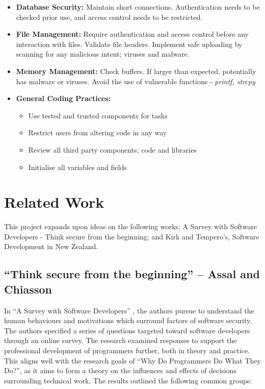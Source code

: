 \begin{itemize}
\item \textbf{Database Security:} Maintain short connections. Authentication needs to be checked prior use, and access control needs to be restricted. 
\item \textbf{File Management:} Require authentication and access control before any interaction with files. Validate file headers. Implement safe uploading by scanning for any malicious intent; viruses and malware. 
\item \textbf{Memory Management:} Check buffers. If larger than expected, potentially has malware or viruses. Avoid the use of vulnerable functions - \textit{printf, strcpy}
\item \textbf{General Coding Practices:}
\begin{itemize}
\item Use tested and trusted components for tasks
\item Restrict users from altering code in any way
\item Review all third party components; code and libraries
\item Initialise all variables and fields
\end{itemize}
\end{itemize}

\section{Related Work}

This project expands upon ideas on the following works; A Survey with Software Developers - Think secure from the beginning; and Kirk and Tempero's, Software Development in New Zealand.

\subsection{“Think secure from the beginning” – Assal and Chiasson}

In “A Survey with Software Developers” \cite{summary1}, the authors pursue to understand the human behaviours and motivations which surround factors of software security. The authors specified a series of questions targeted toward software developers through an online survey. The research examined responses to support the professional development of programmers further, both in theory and practice. This aligns well with the research goals of “Why Do Programmers Do What They Do?”, as it aims to form a theory on the influences and effects of decisions surrounding technical work. 
\newline
\newline
The results outlined the following common groups:

